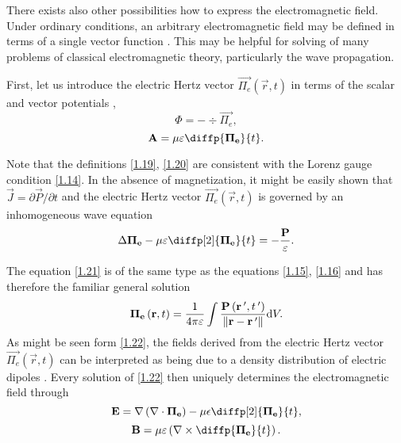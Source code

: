 There exists also other possibilities how to express the electromagnetic field. Under ordinary conditions, an arbitrary electromagnetic field may be defined in terms of a single vector function \cite{Essex1977}. This may be helpful for solving of many problems of classical electromagnetic theory, particularly the wave propagation.

First, let us introduce the electric Hertz vector $ {\vec{\Pi_e}}\left(\vec{r}, t \right) $ in terms of the scalar and vector potentials \cite{Stratton2007},
\begin{equation}
\label{1.19}
\Phi = - \div{\vec{\Pi_e}},
\end{equation}
\begin{equation}
\label{1.20}
\vec{A} = \mu \varepsilon \diffp{\vec{\Pi_e}}{t}.
\end{equation}

Note that the definitions \ref{1.19}, \ref{1.20} are consistent with the Lorenz gauge condition \ref{1.14}. In the absence of magnetization, it might be easily shown that $ \vec{J} = \partial{\vec{P}}/\partial{t} $ and the electric Hertz vector $ {\vec{\Pi_e}}\left(\vec{r}, t \right) $ is governed by an inhomogeneous wave equation
\begin{equation}
\label{1.21}
\laplace{\vec{\Pi_e}} - \mu \varepsilon \diffp[2]{\vec{\Pi_e}}{t} = -\frac{\vec{P}}{\varepsilon}.
\end{equation}

The equation \ref{1.21} is of the same type as the equations \ref{1.15}, \ref{1.16} and has therefore the familiar general solution 
\begin{equation}
\label{1.22}
\mathbf{\Pi_e}\left(\mathbf{r}, t \right) = \frac{1}{4 \pi \varepsilon} \int \frac{\mathbf{P}\left(\mathbf{r^{\: \prime}}, t^{\: \prime} \right)}{\lVert\mathbf{r} - \mathbf{r^{\: \prime}}\rVert} \mathrm{d} V.
\end{equation}
As might be seen form \ref{1.22}, the fields derived from the electric Hertz vector $ {\vec{\Pi_e}}\left(\vec{r}, t \right) $ can be interpreted as being due to a density distribution of electric dipoles \cite{Essex1977}. Every solution of \ref{1.22} then uniquely determines the electromagnetic field through
\begin{equation}
\label{1.23}
\vec{E} = \grad{\left(\div{\vec{\Pi_e}}\right)} - \mu \epsilon \diffp[2]{\vec{\Pi_e}}{t},
\end{equation}
\begin{equation}
\label{1.24}
\vec{B} = \mu \varepsilon \left(\rot{\diffp{\vec{\Pi_e}}{t}}\right).
\end{equation}

